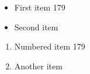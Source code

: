 \documentclass{article}
\begin{document}
\begin{itemize}
\item First item 179
\item Second item
\end{itemize}
\begin{enumerate}
\item Numbered item 179
\item Another item
\end{enumerate}
\end{document}
